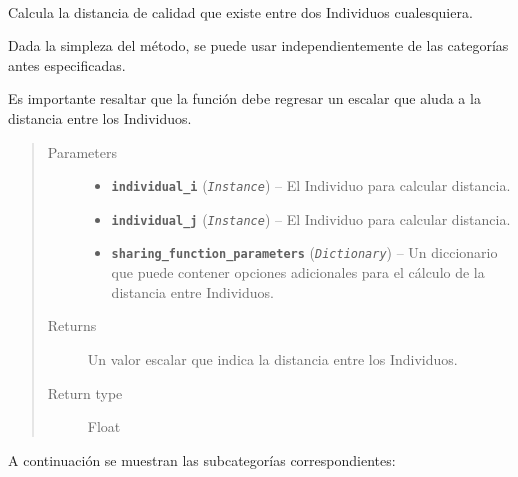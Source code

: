 \documentclass[letterpaper,10pt,english]{sphinxmanual}
\begin{document}
\begin{fulllineitems}
~
\begin{DUlineblock}{0em}
\item[] Calcula la distancia de calidad que existe entre dos Individuos cualesquiera.
\item[] Dada la simpleza del método, se puede usar independientemente de las categorías
antes especificadas.
\item[] Es importante resaltar que la función debe regresar un escalar que aluda a la distancia
entre los Individuos.
\end{DUlineblock}
\begin{quote}\begin{description}
\item[{Parameters}] \leavevmode\begin{itemize}
\item {} 
\textbf{\texttt{individual\_i}} (\emph{\texttt{Instance}}) -- El Individuo para calcular distancia.

\item {} 
\textbf{\texttt{individual\_j}} (\emph{\texttt{Instance}}) -- El Individuo para calcular distancia.

\item {} 
\textbf{\texttt{sharing\_function\_parameters}} (\emph{\texttt{Dictionary}}) -- Un diccionario que puede contener opciones adicionales para
el cálculo de la distancia entre Individuos.

\end{itemize}

\item[{Returns}] \leavevmode
Un valor escalar que indica la distancia entre los Individuos.

\item[{Return type}] \leavevmode
Float

\end{description}\end{quote}

\end{fulllineitems}


A continuación se muestran las subcategorías correspondientes:
\end{document}
